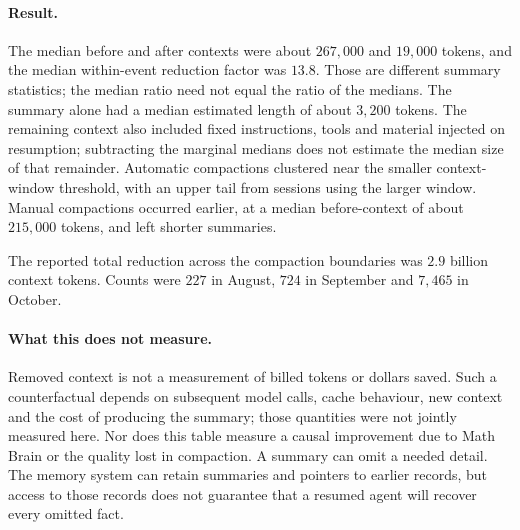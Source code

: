 \paragraph{Result.}
The median before and after contexts were about $267{,}000$ and $19{,}000$ tokens, and the median within-event reduction factor was $13.8$. Those are different summary statistics; the median ratio need not equal the ratio of the medians. The summary alone had a median estimated length of about $3{,}200$ tokens. The remaining context also included fixed instructions, tools and material injected on resumption; subtracting the marginal medians does not estimate the median size of that remainder. Automatic compactions clustered near the smaller context-window threshold, with an upper tail from sessions using the larger window. Manual compactions occurred earlier, at a median before-context of about $215{,}000$ tokens, and left shorter summaries.

The reported total reduction across the compaction boundaries was $2.9$ billion context tokens. Counts were $227$ in August, $724$ in September and $7{,}465$ in October.

\paragraph{What this does not measure.}
Removed context is not a measurement of billed tokens or dollars saved. Such a counterfactual depends on subsequent model calls, cache behaviour, new context and the cost of producing the summary; those quantities were not jointly measured here. Nor does this table measure a causal improvement due to Math Brain or the quality lost in compaction. A summary can omit a needed detail. The memory system can retain summaries and pointers to earlier records, but access to those records does not guarantee that a resumed agent will recover every omitted fact.
